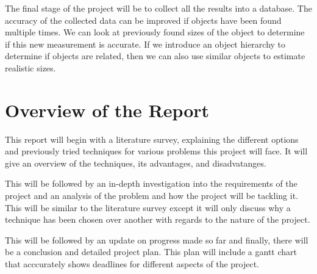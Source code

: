 The final stage of the project will be to collect all the results into a database. The accuracy of the collected data can be improved if objects have been found multiple times. We can look at previously found sizes of the object to determine if this new measurement is accurate. If we introduce an object hierarchy to determine if objects are related, then we can also use similar objects to estimate realistic sizes.

\section{Overview of the Report}

This report will begin with a literature survey, explaining the different options and previously tried techniques for various problems this project will face. It will give an overview of the techniques, its advantages, and disadvatanges.

This will be followed by an in-depth investigation into the requirements of the project and an analysis of the problem and how the project will be tackling it. This will be similar to the literature survey except it will only discuss why a technique has been chosen over another with regards to the nature of the project.

This will be followed by an update on progress made so far and finally, there will be a conclusion and detailed project plan. This plan will include a gantt chart that acccurately shows deadlines for different aspects of the project.